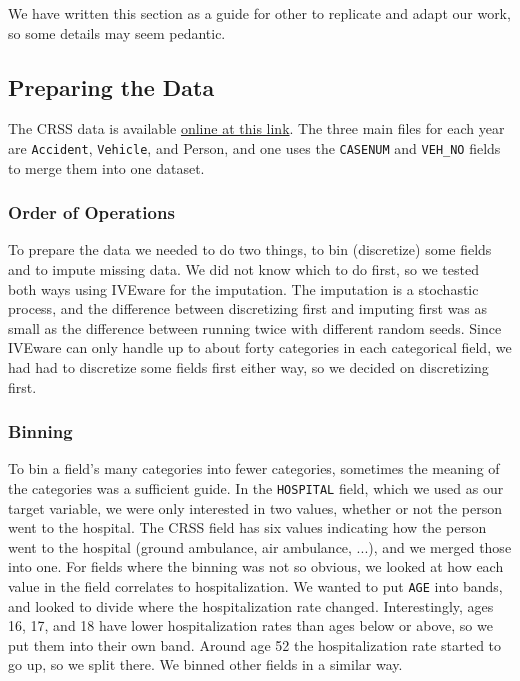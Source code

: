 
We have written this section as a guide for other to replicate and adapt our work, so some details may seem pedantic.  

\subsection{Preparing the Data}

The CRSS data is available \href{https://www.nhtsa.gov/crash-data-systems/crash-report-sampling-system}{online at this link}.  The three main files for each year are {\tt Accident}, {\tt Vehicle}, and {Person}, and one uses the {\tt CASENUM} and \verb|VEH_NO| fields to merge them into one dataset.  


\subsubsection{Order of Operations}

To prepare the data we needed to do two things, to bin (discretize) some fields and to impute missing data.  We did not know which to do first, so we tested both ways using IVEware \citep{IVEware} for the imputation. The imputation is a stochastic process, and the difference between discretizing first and imputing first was as small as the difference between running twice with different random seeds.  Since IVEware can only handle up to about forty categories in each categorical field, we had had to discretize some fields first either way, so we decided on discretizing first.  

\subsubsection{Binning}
To bin a field's many categories into fewer categories, sometimes the meaning of the categories was a sufficient guide.  In the \verb|HOSPITAL| field, which we used as our target variable, we were only interested in two values, whether or not the person went to the hospital.  The CRSS field has six values indicating how the person went to the hospital (ground ambulance, air ambulance, ...), and we merged those into one.  For fields where the binning was not so obvious, we looked at how each value in the field correlates to hospitalization.  We wanted to put \verb|AGE| into bands, and looked to divide  where the hospitalization rate changed.  Interestingly, ages 16, 17, and 18 have lower hospitalization rates than ages below or above, so we put them into their own band.  Around age 52 the hospitalization rate started to go up, so we split there.  We binned other fields in a similar way.  


